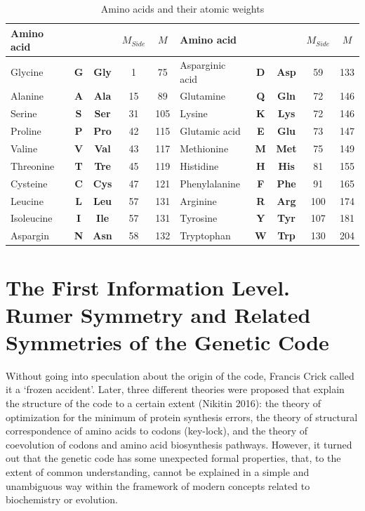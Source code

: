 \documentclass[12pt]{article}
\begin{document}
\begin{table}[htbp]
\centering
\caption{Amino acids and their atomic weights}
\label{tab:amino_acids}
\begin{tabular}{|l|c|c|c|c||l|c|c|c|c|}
\hline
\textbf{Amino acid} & & & $M_{Side}$ & $M$ & \textbf{Amino acid} & & & $M_{Side}$ & $M$ \\
\hline
Glycine & \textbf{G} & \textbf{Gly} & 1 & 75 & Asparginic acid & \textbf{D} & \textbf{Asp} & 59 & 133 \\
Alanine & \textbf{A} & \textbf{Ala} & 15 & 89 & Glutamine & \textbf{Q} & \textbf{Gln} & 72 & 146 \\
Serine & \textbf{S} & \textbf{Ser} & 31 & 105 & Lysine & \textbf{K} & \textbf{Lys} & 72 & 146 \\
Proline & \textbf{P} & \textbf{Pro} & 42 & 115 & Glutamic acid & \textbf{E} & \textbf{Glu} & 73 & 147 \\
Valine & \textbf{V} & \textbf{Val} & 43 & 117 & Methionine & \textbf{M} & \textbf{Met} & 75 & 149 \\
Threonine & \textbf{T} & \textbf{Tre} & 45 & 119 & Histidine & \textbf{H} & \textbf{His} & 81 & 155 \\
Cysteine & \textbf{C} & \textbf{Cys} & 47 & 121 & Phenylalanine & \textbf{F} & \textbf{Phe} & 91 & 165 \\
Leucine & \textbf{L} & \textbf{Leu} & 57 & 131 & Arginine & \textbf{R} & \textbf{Arg} & 100 & 174 \\
Isoleucine & \textbf{I} & \textbf{Ile} & 57 & 131 & Tyrosine & \textbf{Y} & \textbf{Tyr} & 107 & 181 \\
Aspargin & \textbf{N} & \textbf{Asn} & 58 & 132 & Tryptophan & \textbf{W} & \textbf{Trp} & 130 & 204 \\
\hline
\end{tabular}
\end{table}


\section{The First Information Level. Rumer Symmetry and Related Symmetries of the Genetic Code}

Without going into speculation about the origin of the code, Francis Crick called it a `frozen accident'. Later, three different theories were proposed that explain the structure of the code to a certain extent (Nikitin 2016): the theory of optimization for the minimum of protein synthesis errors, the theory of structural correspondence of amino acids to codons (key-lock), and the theory of coevolution of codons and amino acid biosynthesis pathways. However, it turned out that the genetic code has some unexpected formal properties, that, to the extent of common understanding, cannot be explained in a simple and unambiguous way within the framework of modern concepts related to biochemistry or evolution.
\end{document}
